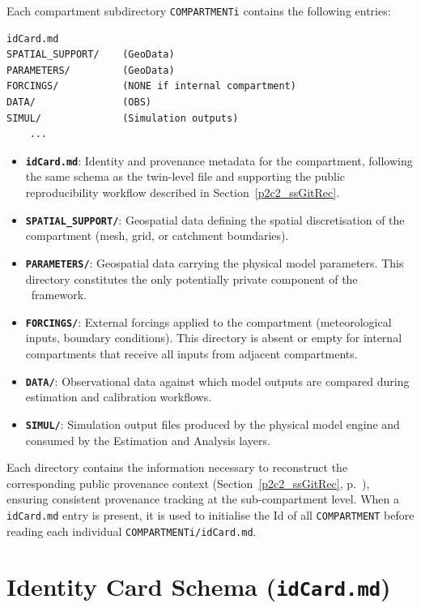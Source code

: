 Each compartment subdirectory \texttt{COMPARTMENTi} contains the following entries:

\begin{verbatim}
idCard.md
SPATIAL_SUPPORT/    (GeoData)
PARAMETERS/         (GeoData)
FORCINGS/           (NONE if internal compartment)
DATA/               (OBS)
SIMUL/              (Simulation outputs)
    ...
\end{verbatim}

\begin{itemize}
    \item \textbf{\texttt{idCard.md}}: Identity and provenance metadata for the compartment, following the same schema as the twin-level file and supporting the public reproducibility workflow described in Section~\ref{p2c2_ssGitRec}.
    \item \textbf{\texttt{SPATIAL\_SUPPORT/}}: Geospatial data defining the spatial discretisation of the compartment (\eg mesh, grid, or catchment boundaries).
    \item \textbf{\texttt{PARAMETERS/}}: Geospatial data carrying the physical model parameters. This directory constitutes the only potentially private component of the \hydrot\ framework.
    \item \textbf{\texttt{FORCINGS/}}: External forcings applied to the compartment (\eg meteorological inputs, boundary conditions). This directory is absent or empty for internal compartments that receive all inputs from adjacent compartments.
    \item \textbf{\texttt{DATA/}}: Observational data against which model outputs are compared during estimation and calibration workflows.
    \item \textbf{\texttt{SIMUL/}}: Simulation output files produced by the physical model engine and consumed by the Estimation and Analysis layers.
\end{itemize}

Each directory contains the information necessary to reconstruct the corresponding public provenance context (Section~\ref{p2c2_ssGitRec}, p.~\pageref{p2c2_ssGitRec}), ensuring consistent provenance tracking at the sub-compartment level. When a \texttt{idCard.md} entry is present, it is used to initialise the Id of all \texttt{COMPARTMENT} before reading each individual \texttt{COMPARTMENTi/idCard.md}.


\section*{Identity Card Schema (\texttt{idCard.md})}

